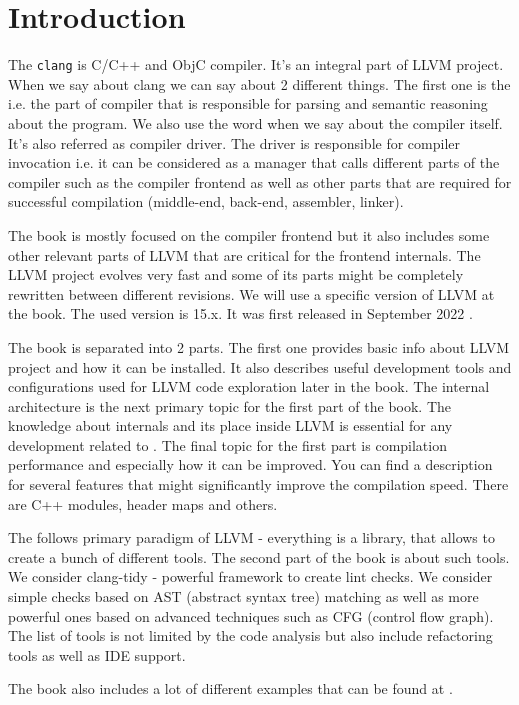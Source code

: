 \chapter*{Introduction}

The \texttt{clang} is C/C++ and ObjC compiler. It's an
integral part of LLVM 
project. When we say about clang we can say about 2 different
things. The first one is the  i.e. the part of
compiler that is responsible for parsing and semantic reasoning about
the program. We also use the word \clang when we say
about the compiler itself. It's also referred as compiler driver. The
driver is responsible for compiler invocation i.e. it can be
considered as a manager that calls different parts of the
compiler such as the compiler
frontend as well as other parts that are required for successful
compilation (middle-end, back-end, assembler, linker).

The book is mostly focused on the \clang compiler
frontend but it also includes some other relevant parts of
LLVM that are critical for the frontend internals. The LLVM project evolves
very fast and some of its parts might be completely rewritten between different
revisions. We will use a specific version of LLVM at the book. The used version
is 15.x. It was first released in September 2022 \cite{llvm:releases}. 

The book is separated into 2 parts. The first one provides basic
info about LLVM project and how it can be installed. It also describes
useful development tools and configurations used for LLVM code
exploration later in the book. The internal \clang architecture is the next
primary topic for the first part of the book. The knowledge about \clang
internals and its place inside LLVM is essential for any development related to
\clang. The final topic for the first part is compilation performance and
especially how it can be improved. You can find a description for several \clang
features that might significantly improve the compilation speed. There are C++ modules, header maps and others.

The \clang follows primary paradigm of LLVM -
everything is a library, that allows to create a bunch of different
tools. The second part of the book is about such tools. We consider clang-tidy -
powerful framework to create lint checks. We consider simple checks based on AST
(abstract syntax tree) matching as well as more powerful ones based on advanced
techniques such as CFG (control flow graph). The list of tools is not limited by
the code analysis but also include refactoring tools as well as IDE support.


The book also includes a lot of different examples that can be found at
\cite{github:clangbook_src}.
